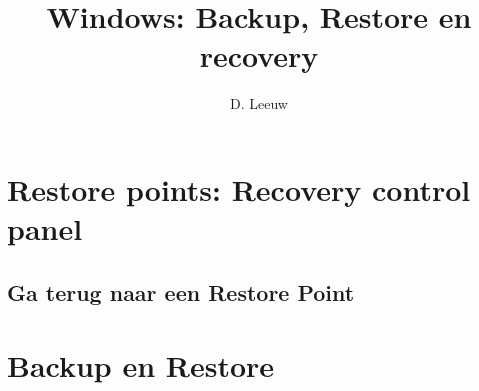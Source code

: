 \documentclass[a4paper,12pt,twoside,titlepage]{article}
\author{D. Leeuw}
\title{Windows: Backup, Restore en recovery}
\date{\today\\
0.0.0
\vfill
\raggedright
\copyright\ 2025 Dennis Leeuw\\
}
\begin{document}

\maketitle




\section{Restore points: Recovery control panel}

\subsection{Ga terug naar een Restore Point}


\section{Backup en Restore}


\printindex
\end{document}
